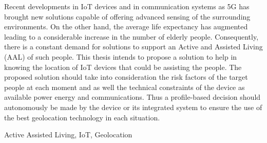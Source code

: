    
   


 Recent developments in IoT devices and in communication systems as 5G has brought new solutions capable of offering advanced sensing of the surrounding environments. On the other hand, the average life expectancy has augmented leading to a considerable increase in the number of elderly people. Consequently, there is a constant demand for solutions to support an Active and Assisted Living (AAL) of such people. This thesis intends to propose a solution to help in knowing the location of IoT devices that could be assisting the people. The proposed solution should take into consideration the risk factors of the target people at each moment and as well the technical constraints of the device as available power energy and communications. Thus a profile-based decision should autonomously be made by the device or its integrated system to ensure the use of the best geolocation technology in each situation.


\begin{keywords}
Active Assisted Living, IoT, Geolocation
\end{keywords} 